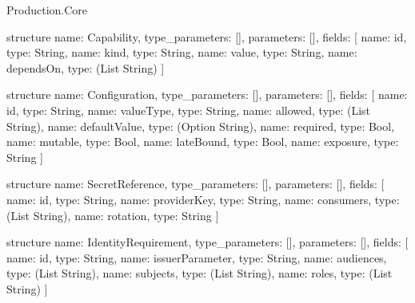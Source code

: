 \begin{lexlean}{Production.Core}
\begin{semanticmodule}
structure{
  name: Capability,
  type_parameters: [],
  parameters: [],
  fields: [
    {name: id, type: String},
    {name: kind, type: String},
    {name: value, type: String},
    {name: dependsOn, type: (List String)}
  ]
}

structure{
  name: Configuration,
  type_parameters: [],
  parameters: [],
  fields: [
    {name: id, type: String},
    {name: valueType, type: String},
    {name: allowed, type: (List String)},
    {name: defaultValue, type: (Option String)},
    {name: required, type: Bool},
    {name: mutable, type: Bool},
    {name: lateBound, type: Bool},
    {name: exposure, type: String}
  ]
}

structure{
  name: SecretReference,
  type_parameters: [],
  parameters: [],
  fields: [
    {name: id, type: String},
    {name: providerKey, type: String},
    {name: consumers, type: (List String)},
    {name: rotation, type: String}
  ]
}

structure{
  name: IdentityRequirement,
  type_parameters: [],
  parameters: [],
  fields: [
    {name: id, type: String},
    {name: issuerParameter, type: String},
    {name: audiences, type: (List String)},
    {name: subjects, type: (List String)},
    {name: roles, type: (List String)}
  ]
}
\end{semanticmodule}
\end{lexlean}
